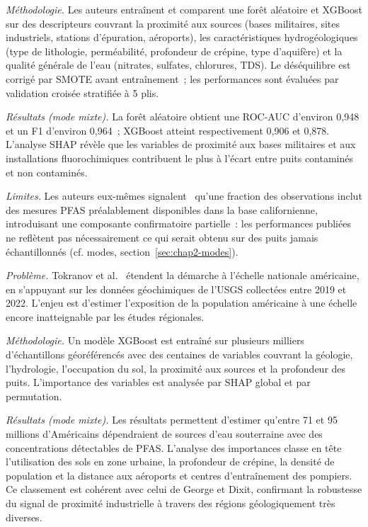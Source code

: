 \emph{M\'ethodologie.}
Les auteurs entra\^inent et comparent une for\^et al\'eatoire et XGBoost sur des descripteurs couvrant la proximit\'e aux sources (bases militaires, sites industriels, stations d'\'epuration, a\'eroports), les caract\'eristiques hydrog\'eologiques (type de lithologie, perm\'eabilit\'e, profondeur de cr\'epine, type d'aquif\`ere) et la qualit\'e g\'en\'erale de l'eau (nitrates, sulfates, chlorures, TDS).
Le d\'es\'equilibre est corrig\'e par SMOTE avant entra\^inement~; les performances sont \'evalu\'ees par validation crois\'ee stratifi\'ee \`a 5 plis.

\emph{R\'esultats (mode mixte).}
La for\^et al\'eatoire obtient une ROC-AUC d'environ 0,948 et un F1 d'environ 0,964~; XGBoost atteint respectivement 0,906 et 0,878.
L'analyse SHAP r\'ev\`ele que les variables de proximit\'e aux bases militaires et aux installations fluorochimiques contribuent le plus \`a l'\'ecart entre puits contamin\'es et non contamin\'es.

\emph{Limites.}
Les auteurs eux-m\^emes signalent~\cite{george2021pfas} qu'une fraction des observations inclut des mesures PFAS pr\'ealablement disponibles dans la base californienne, introduisant une composante confirmatoire partielle~: les performances publi\'ees ne refl\`etent pas n\'ecessairement ce qui serait obtenu sur des puits jamais \'echantillonn\'es (cf. modes, section~\ref{sec:chap2-modes}).


\label{sec:art-tokranov2024}

\emph{Probl\`eme.}
Tokranov et al.~\cite{tokranov2024pfas} \'etendent la d\'emarche \`a l'\'echelle nationale am\'ericaine, en s'appuyant sur les donn\'ees g\'eochimiques de l'USGS collect\'ees entre 2019 et 2022.
L'enjeu est d'estimer l'exposition de la population am\'ericaine \`a une \'echelle encore inatteignable par les \'etudes r\'egionales.

\emph{M\'ethodologie.}
Un mod\`ele XGBoost est entra\^in\'e sur plusieurs milliers d'\'echantillons g\'eor\'ef\'erenc\'es avec des centaines de variables couvrant la g\'eologie, l'hydrologie, l'occupation du sol, la proximit\'e aux sources et la profondeur des puits.
L'importance des variables est analys\'ee par SHAP global et par permutation.

\emph{R\'esultats (mode mixte).}
Les r\'esultats permettent d'estimer qu'entre 71 et 95 millions d'Am\'ericains d\'ependraient de sources d'eau souterraine avec des concentrations d\'etectables de PFAS.
L'analyse des importances classe en t\^ete l'utilisation des sols en zone urbaine, la profondeur de cr\'epine, la densit\'e de population et la distance aux a\'eroports et centres d'entra\^inement des pompiers.
Ce classement est coh\'erent avec celui de George et Dixit, confirmant la robustesse du signal de proximit\'e industrielle \`a travers des r\'egions g\'eologiquement tr\`es diverses.

